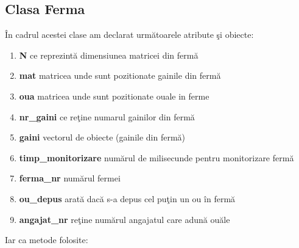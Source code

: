 \documentclass[12pt,a4paper]{article}
\begin{document}
\subsection{Clasa Ferma}
	\^{I}n cadrul acestei clase am declarat urm\u{a}toarele atribute \c{s}i obiecte:
	\begin{enumerate}
		\item \textbf{N} ce reprezint\u{a} dimensiunea matricei din ferm\u{a}
		\item \textbf{mat} matricea unde sunt pozitionate gainile din ferm\u{a}
		\item \textbf{oua} matricea unde sunt pozitionate ouale in ferme
		\item \textbf{nr\_gaini} ce re\c{t}ine numarul gainilor din ferm\u{a}
		\item \textbf{gaini} vectorul de obiecte (gainile din ferm\u{a})
  		\item \textbf{timp\_monitorizare} num\u{a}rul de milisecunde pentru monitorizare ferm\u{a}  
		\item \textbf{ferma\_nr} num\u{a}rul fermei
  		\item \textbf{ou\_depus} arat\u{a} dac\u{a} s-a depus cel pu\c{t}in un ou \^{i}n ferm\u{a}
		\item \textbf{angajat\_nr} re\c{t}ine num\u{a}rul angajatul care adun\u{a} ou\u{a}le
	\end{enumerate}
	Iar ca metode folosite:
\end{document}
